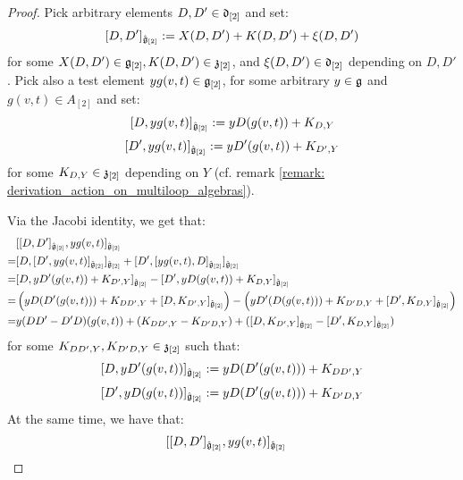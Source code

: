             \begin{proof}
                Pick arbitrary elements $D, D' \in \mathfrak{d}_{[2]}$ and set:
                    $$[D, D']_{\hat{\mathfrak{g}}_{[2]}} := X(D, D') + K(D, D') + \xi(D, D')$$
                for some $X(D, D') \in \mathfrak{g}_{[2]}, K(D, D') \in \mathfrak{z}_{[2]}$, and $\xi(D, D') \in \mathfrak{d}_{[2]}$ depending on $D, D'$. Pick also a test element $y g(v, t) \in \mathfrak{g}_{[2]}$, for some arbitrary $y \in \mathfrak{g}$ and $g(v, t) \in A_{[2]}$ and set:
                    $$[D, y g(v, t)]_{\hat{\mathfrak{g}}_{[2]}} := y D( g(v, t) ) + K_{D, Y}$$
                    $$[D', y g(v, t)]_{\hat{\mathfrak{g}}_{[2]}} := y D'( g(v, t) ) + K_{D', Y}$$
                for some $K_{D, Y} \in \mathfrak{z}_{[2]}$ depending on $Y$ (cf. remark \ref{remark: derivation_action_on_multiloop_algebras}).
                
                Via the Jacobi identity, we get that:
                    $$
                        \begin{aligned}
                            & [ [D, D']_{\hat{\g}_{[2]}}, y g(v, t) ]_{\hat{\g}_{[2]}}
                            \\
                            = & [ D, [ D', y g(v, t) ]_{\hat{\g}_{[2]}} ]_{\hat{\g}_{[2]}} + [ D', [ y g(v, t), D ]_{\hat{\g}_{[2]}} ]_{\hat{\g}_{[2]}}
                            \\
                            = & [ D, y D'( g(v, t) ) + K_{D', Y} ]_{\hat{\g}_{[2]}} - [ D', y D( g(v, t) ) + K_{D, Y} ]_{\hat{\g}_{[2]}}
                            \\
                            = & \left( y D( D'(g(v, t)) ) + K_{DD', Y} + [ D, K_{D', Y} ]_{\hat{\g}_{[2]}} \right) - \left( y D'( D(g(v, t)) ) + K_{D'D, Y} + [ D', K_{D, Y} ]_{\hat{\g}_{[2]}} \right)
                            \\
                            = & y (DD' - D'D)( g(v, t) ) + ( K_{DD', Y} - K_{D'D, Y} ) + ( [ D, K_{D', Y} ]_{\hat{\g}_{[2]}} - [ D', K_{D, Y} ]_{\hat{\g}_{[2]}} )
                        \end{aligned}
                    $$
                for some $K_{DD', Y}, K_{D'D, Y} \in \z_{[2]}$ such that:
                    $$[ D, y D'( g(v, t) ) ]_{\hat{\g}_{[2]}} := y D( D'( g(v, t) ) ) + K_{DD', Y}$$
                    $$[ D', y D( g(v, t) ) ]_{\hat{\g}_{[2]}} := y D( D'( g(v, t) ) ) + K_{D'D, Y}$$
                At the same time, we have that:
                    $$
                        \begin{aligned}
                            & [ [D, D']_{\hat{\g}_{[2]}}, y g(v, t) ]_{\hat{\g}_{[2]}}

\end{aligned}$$
\end{proof}
